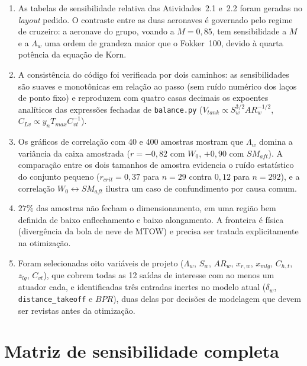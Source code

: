 \documentclass[11pt,a4paper]{article}
\newcommand{\code}[1]{\texttt{\small #1}}
\begin{document}
\begin{enumerate}
\item As tabelas de sensibilidade relativa das Atividades~2.1 e~2.2 foram
geradas no \emph{layout} pedido. O contraste entre as duas aeronaves \'e
governado pelo regime de cruzeiro: a aeronave do grupo, voando a $M = 0{,}85$,
tem sensibilidade a $M$ e a $\Lambda_w$ uma ordem de grandeza maior que o
Fokker~100, devido \`a quarta pot\^encia da equa\c{c}\~ao de Korn.

\item A consist\^encia do c\'odigo foi verificada por dois caminhos: as
sensibilidades s\~ao suaves e monot\^onicas em rela\c{c}\~ao ao passo (sem
ru\'ido num\'erico dos la\c{c}os de ponto fixo) e reproduzem com quatro casas
decimais os expoentes anal\'iticos das express\~oes fechadas de
\code{balance.py} ($V_{tank} \propto S_w^{3/2}AR_w^{-1/2}$,
$C_{Lv} \propto y_n T_{max} C_{vt}^{-1}$).

\item Os gr\'aficos de correla\c{c}\~ao com 40 e 400 amostras mostram que
$\Lambda_w$ domina a vari\^ancia da caixa amostrada
($r = -0{,}82$ com $W_0$, $+0{,}90$ com $SM_{aft}$). A compara\c{c}\~ao entre
os dois tamanhos de amostra evidencia o ru\'ido estat\'istico do conjunto
pequeno ($r_{crit} = 0{,}37$ para $n = 29$ contra $0{,}12$ para $n = 292$), e
a correla\c{c}\~ao $W_0 \leftrightarrow SM_{aft}$ ilustra um caso de
confundimento por causa comum.

\item $27\%$ das amostras n\~ao fecham o dimensionamento, em uma regi\~ao bem
definida de baixo enflechamento e baixo alongamento. A fronteira \'e f\'isica
(diverg\^encia da bola de neve de MTOW) e precisa ser tratada explicitamente na
otimiza\c{c}\~ao.

\item Foram selecionadas oito vari\'aveis de projeto
($\Lambda_w$, $S_w$, $AR_w$, $x_{r,w}$, $x_{mlg}$, $C_{h,t}$, $z_{lg}$,
$C_{vt}$), que cobrem todas as 12 sa\'idas de interesse com ao menos um
atuador cada, e identificadas tr\^es entradas inertes no modelo atual
($\delta_w$, \code{distance\_takeoff} e $BPR$), duas delas por decis\~oes de
modelagem que devem ser revistas antes da otimiza\c{c}\~ao.
\end{enumerate}

\appendix

\section{Matriz de sensibilidade completa}
\label{ap:matriz}
\end{document}
